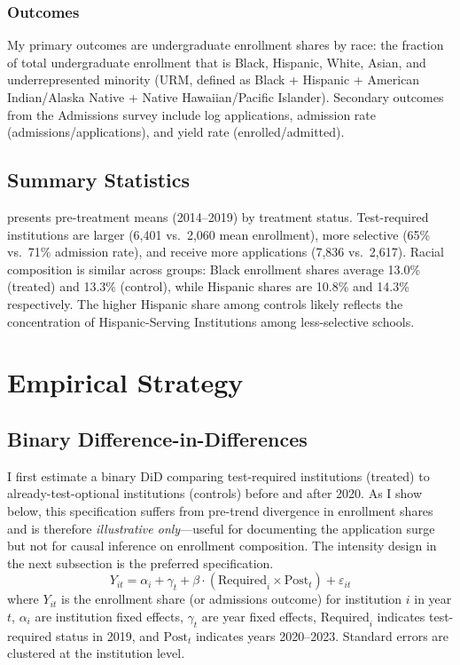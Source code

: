 \documentclass[12pt]{article}
\begin{document}
\subsubsection*{Outcomes} My primary outcomes are undergraduate enrollment shares by race: the fraction of total undergraduate enrollment that is Black, Hispanic, White, Asian, and underrepresented minority (URM, defined as Black + Hispanic + American Indian/Alaska Native + Native Hawaiian/Pacific Islander). Secondary outcomes from the Admissions survey include log applications, admission rate (admissions/applications), and yield rate (enrolled/admitted).

\subsection{Summary Statistics}

 presents pre-treatment means (2014--2019) by treatment status. Test-required institutions are larger (6,401 vs.\ 2,060 mean enrollment), more selective (65\% vs.\ 71\% admission rate), and receive more applications (7,836 vs.\ 2,617). Racial composition is similar across groups: Black enrollment shares average 13.0\% (treated) and 13.3\% (control), while Hispanic shares are 10.8\% and 14.3\% respectively. The higher Hispanic share among controls likely reflects the concentration of Hispanic-Serving Institutions among less-selective schools.




\section{Empirical Strategy}
\label{sec:strategy}

\subsection{Binary Difference-in-Differences}

I first estimate a binary DiD comparing test-required institutions (treated) to already-test-optional institutions (controls) before and after 2020. As I show below, this specification suffers from pre-trend divergence in enrollment shares and is therefore \textit{illustrative only}---useful for documenting the application surge but not for causal inference on enrollment composition. The intensity design in the next subsection is the preferred specification.
\begin{equation}
Y_{it} = \alpha_i + \gamma_t + \beta \cdot (\text{Required}_i \times \text{Post}_t) + \varepsilon_{it}
\label{eq:binary}
\end{equation}
where $Y_{it}$ is the enrollment share (or admissions outcome) for institution $i$ in year $t$, $\alpha_i$ are institution fixed effects, $\gamma_t$ are year fixed effects, $\text{Required}_i$ indicates test-required status in 2019, and $\text{Post}_t$ indicates years 2020--2023. Standard errors are clustered at the institution level.
\end{document}
